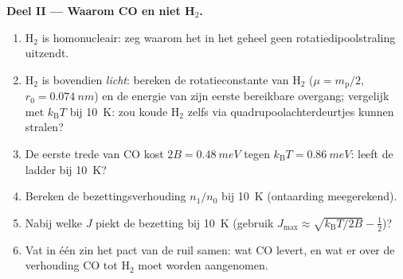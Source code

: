 \begin{problem}
\medskip\noindent\textbf{Deel II --- Waarom CO en niet H$_2$.}
\begin{enumerate}[resume]
  \item H$_2$ is homonucleair: zeg waarom het in het geheel geen
        rotatiedipoolstraling uitzendt.
  \item H$_2$ is bovendien \emph{licht}: bereken de rotatieconstante van
        H$_2$ ($\mu = m_{\text{p}}/2$, $r_0 = \qty{0.074}{nm}$) en de
        energie van zijn eerste bereikbare overgang; vergelijk met
        $k_{\text{B}}T$ bij \qty{10}{K}: zou koude H$_2$ zelfs via
        quadrupoolachterdeurtjes kunnen stralen?
  \item De eerste trede van CO kost $2B = \qty{0.48}{meV}$ tegen
        $k_{\text{B}}T = \qty{0.86}{meV}$: leeft de ladder bij
        \qty{10}{K}?
  \item Bereken de bezettingsverhouding $n_1/n_0$ bij \qty{10}{K}
        (ontaarding meegerekend).
  \item Nabij welke $J$ piekt de bezetting bij \qty{10}{K} (gebruik
        $J_{\max} \approx \sqrt{k_{\text{B}}T/2B} - \tfrac12$)?
  \item Vat in één zin het pact van de ruil samen: wat CO levert, en wat
        er over de verhouding CO tot H$_2$ moet worden aangenomen.
\end{enumerate}


\end{problem}
